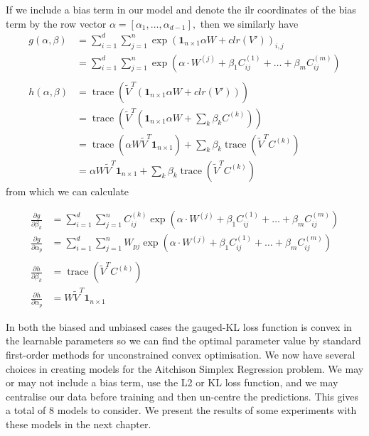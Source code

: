 \documentclass[BSc]{usydthesis}
\numberwithin{equation}{chapter}
\theoremstyle{remark}
\begin{document}
If we include a bias term in our model and denote the ilr coordinates of the bias term by the row vector $\alpha = [\alpha_1, \ldots, \alpha_{d-1}],$ then we similarly have 
\begin{align*}
 g(\alpha, \beta) &= \sum_{i=1}^d \sum_{j=1}^n \exp \left( \mathbf{1}_{n\times 1} \alpha W + clr(V')\right)_{i,j} \\
         &= \sum_{i=1}^d \sum_{j=1}^n \exp \left(\alpha \cdot W^{(j)} + \beta_1 C^{(1)}_{ij} + \ldots + \beta_m C^{(m)}_{ij}
 \right)\\
 \ & \ \\
 h(\alpha, \beta) &= \operatorname{trace}\left( \tilde{V}^T \left( \mathbf{1}_{n\times 1} \alpha W +clr(V') \right)  \right)\\
        &= \operatorname{trace}\left( \tilde{V}^T \left( \mathbf{1}_{n\times 1}\alpha W + \sum_k \beta_k C^{(k)} \right)  \right)\\
          &= \operatorname{trace}\left(\alpha W \tilde{V}^T \mathbf{1}_{n\times 1} \right) + \sum_k \beta_k \operatorname{trace}\left( \tilde{V}^T C^{(k)} \right)\\
          &= \alpha W \tilde{V}^T \mathbf{1}_{n\times 1}  + \sum_k \beta_k \operatorname{trace}\left( \tilde{V}^T C^{(k)} \right)
\end{align*}
from which we can calculate

\begin{align*}
 \frac{ \partial g}{\partial \beta_k } &= \sum_{i=1}^d \sum_{j=1}^n C^{(k)}_{ij} \exp \left(\alpha \cdot W^{(j)} +  \beta_1 C^{(1)}_{ij} + \ldots + \beta_m C^{(m)}_{ij} \right) \\
 \frac{ \partial g}{\partial \alpha_p } &= \sum_{i=1}^d \sum_{j=1}^n W_{pj} \exp \left(\alpha \cdot W^{(j)} +  \beta_1 C^{(1)}_{ij} + \ldots + \beta_m C^{(m)}_{ij} \right) \\
 \ & \ \\
 \frac{ \partial h}{\partial \beta_k } &= \operatorname{trace}\left( \tilde{V}^T C^{(k)}\right)\\
 \frac{ \partial h}{\partial \alpha_p } &= W \tilde{V}^T \mathbf{1}_{n\times 1}
\end{align*}

In both the biased and unbiased cases the gauged-KL loss function is convex in the learnable parameters so we can find the optimal parameter value by standard first-order methods for unconstrained convex optimisation. We now have several choices in creating models for the Aitchison Simplex Regression problem. We may or may not include a bias term, use the L2 or KL loss function, and we may centralise our data before training and then un-centre the predictions. This gives a total of 8 models to consider. We present the results of some experiments with these models in the next chapter.
\end{document}
